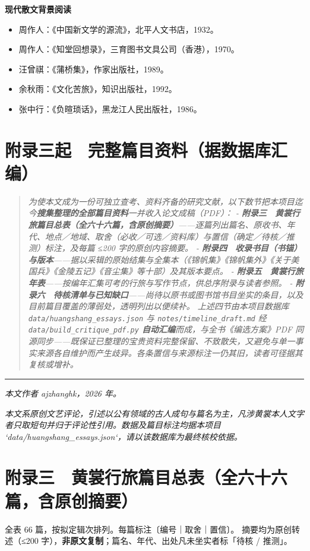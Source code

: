 \documentclass[UTF8,fontset=none,zihao=-4,a4paper]{ctexart}
\begin{document}
\textbf{现代散文背景阅读}

\begin{itemize}
\item 周作人：《中国新文学的源流》，北平人文书店，1932。
\item 周作人：《知堂回想录》，三育图书文具公司（香港），1970。
\item 汪曾祺：《蒲桥集》，作家出版社，1989。
\item 余秋雨：《文化苦旅》，知识出版社，1992。
\item 张中行：《负暄琐话》，黑龙江人民出版社，1986。
\end{itemize}


\section{附录三起　完整篇目资料（据数据库汇编）}


\begin{quote}\small\itshape
为使本文成为一份可独立查考、资料齐备的研究文献，以下数节把本项目迄今\textbf{搜集整理的全部篇目资料}一并收入论文成稿（PDF）： - \textbf{附录三　黄裳行旅篇目总表（全六十六篇，含原创摘要）}——逐篇列出篇名、原收书、年代、地点／地域、取舍（必收／可选／资料库）与置信（确定／待核／推测）标注，及每篇 ≤200 字的原创内容摘要。 - \textbf{附录四　收录书目（书锚）与版本}——据以采辑的原始结集与全集本（《锦帆集》《锦帆集外》《关于美国兵》《金陵五记》《音尘集》等十部）及其版本要点。 - \textbf{附录五　黄裳行旅年表}——按编年汇集可考的行旅与写作节点，供总序附录与读者参照。 - \textbf{附录六　待核清单与已知缺口}——尚待以原书或图书馆书目坐实的条目，以及目前篇目覆盖的薄弱处，透明列出以便续补。 上述四节由本项目数据库 \texttt{data/huangshang\_essays.json} 与 \texttt{notes/timeline\_draft.md} 经 \texttt{data/build\_critique\_pdf.py} \textbf{自动汇编}而成，与全书《编选方案》PDF 同源同步——既保证已整理的宝贵资料完整保留、不致散失，又避免与单一事实来源各自维护而产生歧异。各条置信与来源标注一仍其旧，读者可径据其复核或增补。
\end{quote}

\medskip\hrule\medskip

\textit{本文作者 ajzhanghk，2026 年。}


\textit{本文系原创文艺评论，引述以公有领域的古人成句与篇名为主，凡涉黄裳本人文字者只取短句并归于评论性引用。数据及篇目标注均据本项目 `data/huangshang\_essays.json`，请以该数据库为最终核校依据。}


\clearpage

\section{附录三　黄裳行旅篇目总表（全六十六篇，含原创摘要）}
\noindent\small 全表 66 篇，按拟定辑次排列。每篇标注〔编号｜取舍｜置信〕。
摘要均为原创转述（≤200 字），\textbf{非原文复制}；篇名、年代、出处凡未坐实者标「待核 / 推测」。\normalsize
\medskip
\end{document}
